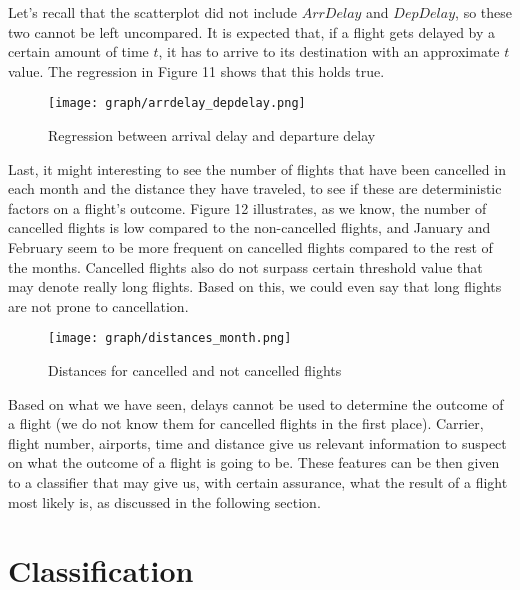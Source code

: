 \documentclass{article}
\begin{document}
    Let's recall that the scatterplot did not include $ArrDelay$ and $DepDelay$, so these two cannot be left uncompared. It is expected that, if a flight gets delayed by a certain amount of time $t$, it has to arrive to its destination with an approximate $t$ value. The regression in Figure 11 shows that this holds true.
	\begin{figure}[H]
	  \texttt{[image: graph/arrdelay\_depdelay.png]}
	  \caption{Regression between arrival delay and departure delay}
	  \label{fig:graph1}
	\end{figure}\newline
	Last, it might interesting to see the number of flights that have been cancelled in each month and the distance they have traveled, to see if these are deterministic factors on a flight's outcome. Figure 12 illustrates, as we know, the number of cancelled flights is low compared to the non-cancelled flights, and January and February seem to be more frequent on cancelled flights compared to the rest of the months. Cancelled flights also do not surpass certain threshold value that may denote really long flights. Based on this, we could even say that long flights are not prone to cancellation.
	\begin{figure}
	  \texttt{[image: graph/distances\_month.png]}
	  \caption{Distances for cancelled and not cancelled flights}
	  \label{fig:graph1}
	\end{figure}\newline
	\indent Based on what we have seen, delays cannot be used to determine the outcome of a flight (we do not know them for cancelled flights in the first place). Carrier, flight number, airports, time and distance give us relevant information to suspect on what the outcome of a flight is going to be. These features can be then given to a classifier that may give us, with certain assurance, what the result of a flight most likely is, as discussed in the following section.
	\newpage
	\section{Classification}
\end{document}
